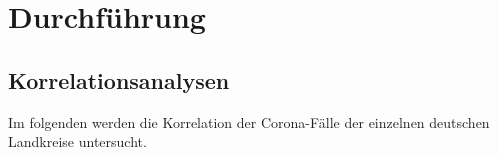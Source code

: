 \chapter{Durchführung}\label{chap:Durchführung}
\section{Korrelationsanalysen}
Im folgenden werden die Korrelation der Corona-Fälle der einzelnen deutschen Landkreise untersucht.

